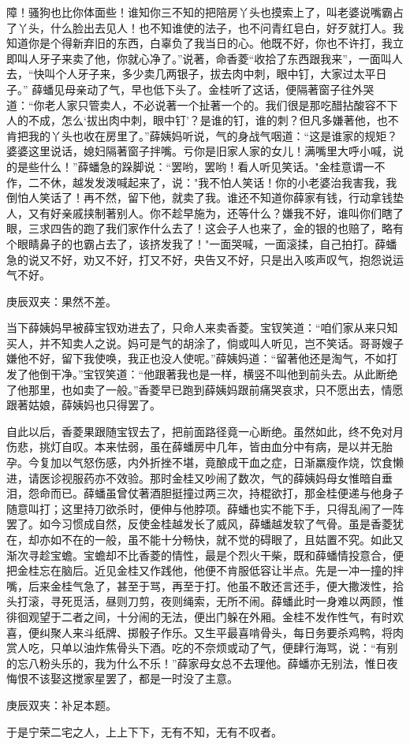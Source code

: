 \begin{parag}
障！骚狗也比你体面些！谁知你三不知的把陪房丫头也摸索上了，叫老婆说嘴霸占了丫头，什么脸出去见人！也不知谁使的法子，也不问青红皂白，好歹就打人。我知道你是个得新弃旧的东西，白辜负了我当日的心。他既不好，你也不许打，我立即叫人牙子来卖了他，你就心净了。”说著，命香菱“收拾了东西跟我来”，一面叫人去，“快叫个人牙子来，多少卖几两银子，拔去肉中刺，眼中钉，大家过太平日子。” 薛蟠见母亲动了气，早也低下头了。金桂听了这话，便隔著窗子往外哭道：“你老人家只管卖人，不必说著一个扯著一个的。我们很是那吃醋拈酸容不下人的不成，怎么‘拔出肉中刺，眼中钉’？是谁的钉，谁的刺？但凡多嫌著他，也不肯把我的丫头也收在房里了。”薛姨妈听说，气的身战气咽道：“这是谁家的规矩？婆婆这里说话，媳妇隔著窗子拌嘴。亏你是旧家人家的女儿！满嘴里大呼小喊，说的是些什么！”薛蟠急的跺脚说：“罢哟，罢哟！看人听见笑话。"金桂意谓一不作，二不休，越发发泼喊起来了，说："我不怕人笑话！你的小老婆治我害我，我倒怕人笑话了！再不然，留下他，就卖了我。谁还不知道你薛家有钱，行动拿钱垫人，又有好亲戚挟制著别人。你不趁早施为，还等什么？嫌我不好，谁叫你们瞎了眼，三求四告的跑了我们家作什么去了！这会子人也来了，金的银的也赔了，略有个眼睛鼻子的也霸占去了，该挤发我了！"一面哭喊，一面滚揉，自己拍打。薛蟠急的说又不好，劝又不好，打又不好，央告又不好，只是出入咳声叹气，抱怨说运气不好。\begin{note}庚辰双夹：果然不差。\end{note}当下薛姨妈早被薛宝钗劝进去了，只命人来卖香菱。宝钗笑道：“咱们家从来只知买人，并不知卖人之说。妈可是气的胡涂了，倘或叫人听见，岂不笑话。哥哥嫂子嫌他不好，留下我使唤，我正也没人使呢。”薛姨妈道：“留著他还是淘气，不如打发了他倒干净。”宝钗笑道：“他跟著我也是一样，横竖不叫他到前头去。从此断绝了他那里，也如卖了一般。”香菱早已跑到薛姨妈跟前痛哭哀求，只不愿出去，情愿跟著姑娘，薛姨妈也只得罢了。
\end{parag}


\begin{parag}
    自此以后，香菱果跟随宝钗去了，把前面路径竟一心断绝。虽然如此，终不免对月伤悲，挑灯自叹。本来怯弱，虽在薛蟠房中几年，皆由血分中有病，是以并无胎孕。今复加以气怒伤感，内外折挫不堪，竟酿成干血之症，日渐羸瘦作烧，饮食懒进，请医诊视服药亦不效验。那时金桂又吵闹了数次，气的薛姨妈母女惟暗自垂泪，怨命而已。薛蟠虽曾仗著酒胆挺撞过两三次，持棍欲打，那金桂便递与他身子随意叫打；这里持刀欲杀时，便伸与他脖项。薛蟠也实不能下手，只得乱闹了一阵罢了。如今习惯成自然，反使金桂越发长了威风，薛蟠越发软了气骨。虽是香菱犹在，却亦如不在的一般，虽不能十分畅快，就不觉的碍眼了，且姑置不究。如此又渐次寻趁宝蟾。宝蟾却不比香菱的情性，最是个烈火干柴，既和薛蟠情投意合，便把金桂忘在脑后。近见金桂又作践他，他便不肯服低容让半点。先是一冲一撞的拌嘴，后来金桂气急了，甚至于骂，再至于打。他虽不敢还言还手，便大撒泼性，拾头打滚，寻死觅活，昼则刀剪，夜则绳索，无所不闹。薛蟠此时一身难以两顾，惟徘徊观望于二者之间，十分闹的无法，便出门躲在外厢。金桂不发作性气，有时欢喜，便纠聚人来斗纸牌、掷骰子作乐。又生平最喜啃骨头，每日务要杀鸡鸭，将肉赏人吃，只单以油炸焦骨头下酒。吃的不奈烦或动了气，便肆行海骂，说：“有别的忘八粉头乐的，我为什么不乐！”薛家母女总不去理他。薛蟠亦无别法，惟日夜悔恨不该娶这搅家星罢了，都是一时没了主意。\begin{note}庚辰双夹：补足本题。\end{note}于是宁荣二宅之人，上上下下，无有不知，无有不叹者。
\end{parag}


